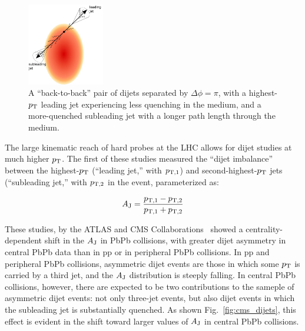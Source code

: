 \begin{figure}[hbtp]
\begin{center}
\includegraphics[width=0.3\textwidth]{illustrations/asymmetric_dijets.pdf}
\caption[Illustration of dijet asymmetry]{A ``back-to-back'' pair of dijets separated by $\Delta\phi = \pi$, with a highest-$p_{\rm T}$ leading jet experiencing less quenching in the medium, and a more-quenched subleading jet with a longer path length through the medium.}
\label{fig:illustration_dijets}
\end{center}
\end{figure}


The large kinematic reach of hard probes at the LHC allows for dijet studies at much higher $p_{\rm T}$.  The first of these studies measured the ``dijet imbalance'' between the highest-$p_{\rm T}$ (``leading jet,'' with $p_{\rm T,1}$) and second-highest-$p_{\rm T}$ jets (``subleading jet,'' with $p_{\rm T, 2}$ in the event, parameterized as: 

\begin{equation}
\label{eq:aj}
A_{\rm J} = \frac{p_{\rm T,1} - p_{\rm T,2}}{p_{\rm T,1} + p_{\rm T,2}}
\end{equation}

\noindent These studies, by the ATLAS and CMS Collaborations~\cite{Aad:2010bu, Chatrchyan:2011sx} showed a centrality-dependent shift in the $A_{\rm J}$ in PbPb collisions, with greater dijet asymmetry in central PbPb data than in pp or in peripheral PbPb collisions.  In pp and peripheral PbPb collisions, asymmetric dijet events are those in which some $p_{\rm T}$ is carried by a third jet, and the $A_{\rm J}$ distribution is steeply falling.  In central PbPb collisions, however, there are expected to be two contributions to the sameple of asymmetric dijet events: not only three-jet events, but also dijet events in which the subleading jet is substantially quenched.  As shown Fig.~\ref{fig:cms_dijets}, this effect is evident in the shift toward larger values of $A_{\rm J}$ in central PbPb collisions. 

